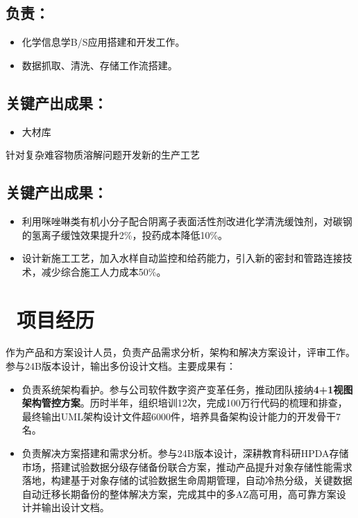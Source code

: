 \documentclass{resume}
\begin{document}
\subsection{\textbf{负责：}}
\begin{itemize}
  \item 化学信息学B/S应用搭建和开发工作。
  \item 数据抓取、清洗、存储工作流搭建。
\end{itemize}
\subsection{\textbf{关键产出成果：}}
\begin{itemize}
  \item 大材库
\end{itemize}
\bigskip
{}
针对复杂难容物质溶解问题开发新的生产工艺
\subsection{\textbf{关键产出成果：}}
\begin{itemize}
  \item 利用咪唑啉类有机小分子配合阴离子表面活性剂改进化学清洗缓蚀剂，对碳钢的氢离子缓蚀效果提升2\%，投药成本降低10\%。
  \item 设计新施工工艺，加入水样自动监控和给药能力，引入新的密封和管路连接技术，减少综合施工人力成本50\%。
\end{itemize}


\section{\faBriefcase\ 项目经历}

作为产品和方案设计人员，负责产品需求分析，架构和解决方案设计，评审工作。参与24B版本设计，输出多份设计文档。主要成果有：
\begin{onehalfspacing}
  \begin{itemize}
    \item 负责系统架构看护。参与公司软件数字资产变革任务，推动团队接纳\textbf{4+1视图架构管控方案}。历时半年，组织培训12次，完成100万行代码的梳理和排查，最终输出UML架构设计文件超6000件，培养具备架构设计能力的开发骨干7名。
    \item 负责解决方案搭建和需求分析。参与24B版本设计，深耕教育科研HPDA存储市场，搭建试验数据分级存储备份联合方案，推动产品提升对象存储性能需求落地，构建基于对象存储的试验数据生命周期管理，自动冷热分级，关键数据自动迁移长期备份的整体解决方案，完成其中的多AZ高可用，高可靠方案设计并输出设计文档。
  \end{itemize}
\end{onehalfspacing}
\end{document}

